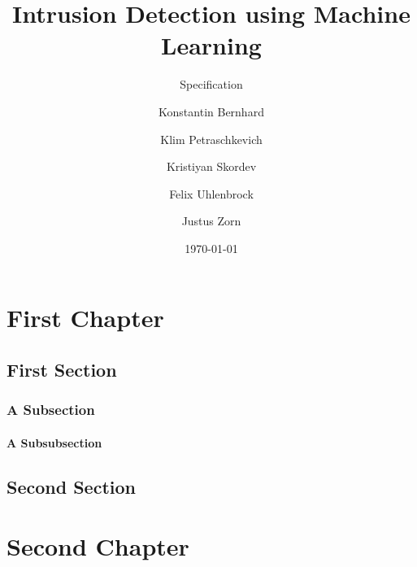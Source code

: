 \documentclass[twoside, english]{reports/assets/sdqtechreport}
\author{Konstantin Bernhard \and Klim Petraschkevich \and Kristiyan Skordev \and Felix Uhlenbrock \and Justus Zorn}
\title{Intrusion Detection using Machine Learning}
\subtitle{Specification}
\date{\today}
\begin{document}

\maketitle

\tableofcontents

\cleardoublepage


\chapter{First Chapter}
\label{chap:FirstContent}

\section{First Section}
\label{sec:FirstContent:FirstSection}

\Blindtext

\subsection{A Subsection}
\label{sec:FirstContent:FirstSubSection}

\Blindtext

\subsubsection{A Subsubsection}

\Blindtext[1]

\section{Second Section}
\label{sec:FirstContent:SecondSection}

\Blindtext

\chapter{Second Chapter}
\label{chap:SecondContent}
\end{document}

